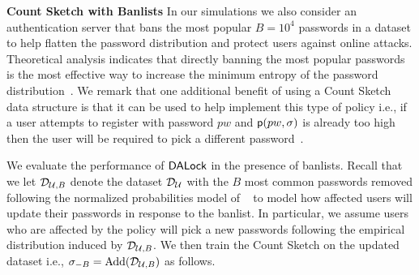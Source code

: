 \textbf{Count Sketch with Banlists} In our simulations we also consider an authentication server that bans the most popular $B=10^4$ passwords in a dataset to help flatten the password distribution and protect users against online attacks. Theoretical analysis indicates that directly banning the most popular passwords is the most effective way to increase the minimum entropy of the password distribution~\cite{BKPS:ACMEC13}. We remark that one additional benefit of using a Count Sketch data structure is that it can be used to help implement this type of policy i.e., if a user attempts to register with password $pw$ and $\textsf{p}(pw,\sigma)$ is already too high then the user will be required to pick a different password~\cite{HTS:SchHerMit10}.


We evaluate the performance of $\mathsf{DALock}$ in the presence of banlists. Recall that we let $\mathcal{D}_{{\mathcal{U}, B}}$ denote the dataset $\mathcal{D}_{{\mathcal{U}}}$ with the $B$ most common passwords removed following the normalized probabilities model of ~\cite{BKPS:ACMEC13} to model how affected users will update their passwords in response to the banlist. In particular, we assume users who are affected by the policy will pick a new passwords following the empirical distribution induced by $\mathcal{D}_{{\mathcal{U}, B}}$. We then train the Count Sketch on the updated dataset i.e., $\sigma_{-B} = \text{Add}(\mathcal{D}_{{\mathcal{U}, B}})$ as follows. 





